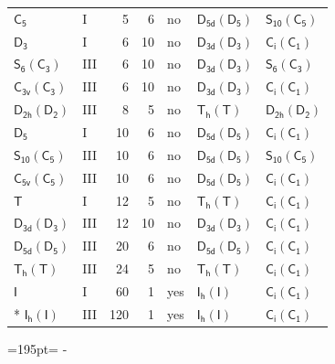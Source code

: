\documentclass[10pt,a4paper]{article}
\newcommand{\needspace}[1]{\par\penalty-100\begingroup\dimen0=#1\relax\dimen2=\pagegoal
  \advance\dimen2-\pagetotal\ifdim\dimen0>\dimen2\relax\ifdim\dimen2>0pt\vfil\break\fi\fi
  \endgroup}
\numberwithin{equation}{section}
\newcommand{\grp}[1]{\mathsf{#1}}
\begin{document}
{\begin{longtable}{@{}llrrlll@{}}
\href{../../../rotation/data/pdf/C5.pdf}{$\grp{C_{5}}$} & I & 5 & 6 & no & \href{D5d-D5.pdf}{$\grp{D_{5d}}(\grp{D_{5}})$} & \href{S10-C5.pdf}{$\grp{S_{10}}(\grp{C_{5}})$}\\
\href{../../../rotation/data/pdf/D3.pdf}{$\grp{D_{3}}$} & I & 6 & 10 & no & \href{D3d-D3.pdf}{$\grp{D_{3d}}(\grp{D_{3}})$} & \href{S2-C1.pdf}{$\grp{C_{i}}(\grp{C_{1}})$}\\
\href{S6-C3.pdf}{$\grp{S_{6}}(\grp{C_{3}})$} & III & 6 & 10 & no & \href{D3d-D3.pdf}{$\grp{D_{3d}}(\grp{D_{3}})$} & \href{S6-C3.pdf}{$\grp{S_{6}}(\grp{C_{3}})$}\\
\href{C3v-C3.pdf}{$\grp{C_{3v}}(\grp{C_{3}})$} & III & 6 & 10 & no & \href{D3d-D3.pdf}{$\grp{D_{3d}}(\grp{D_{3}})$} & \href{S2-C1.pdf}{$\grp{C_{i}}(\grp{C_{1}})$}\\
\href{D2h-D2.pdf}{$\grp{D_{2h}}(\grp{D_{2}})$} & III & 8 & 5 & no & \href{Th-T.pdf}{$\grp{T_{h}}(\grp{T})$} & \href{D2h-D2.pdf}{$\grp{D_{2h}}(\grp{D_{2}})$}\\
\href{../../../rotation/data/pdf/D5.pdf}{$\grp{D_{5}}$} & I & 10 & 6 & no & \href{D5d-D5.pdf}{$\grp{D_{5d}}(\grp{D_{5}})$} & \href{S2-C1.pdf}{$\grp{C_{i}}(\grp{C_{1}})$}\\
\href{S10-C5.pdf}{$\grp{S_{10}}(\grp{C_{5}})$} & III & 10 & 6 & no & \href{D5d-D5.pdf}{$\grp{D_{5d}}(\grp{D_{5}})$} & \href{S10-C5.pdf}{$\grp{S_{10}}(\grp{C_{5}})$}\\
\href{C5v-C5.pdf}{$\grp{C_{5v}}(\grp{C_{5}})$} & III & 10 & 6 & no & \href{D5d-D5.pdf}{$\grp{D_{5d}}(\grp{D_{5}})$} & \href{S2-C1.pdf}{$\grp{C_{i}}(\grp{C_{1}})$}\\
\href{../../../rotation/data/pdf/T.pdf}{$\grp{T}$} & I & 12 & 5 & no & \href{Th-T.pdf}{$\grp{T_{h}}(\grp{T})$} & \href{S2-C1.pdf}{$\grp{C_{i}}(\grp{C_{1}})$}\\
\href{D3d-D3.pdf}{$\grp{D_{3d}}(\grp{D_{3}})$} & III & 12 & 10 & no & \href{D3d-D3.pdf}{$\grp{D_{3d}}(\grp{D_{3}})$} & \href{S2-C1.pdf}{$\grp{C_{i}}(\grp{C_{1}})$}\\
\href{D5d-D5.pdf}{$\grp{D_{5d}}(\grp{D_{5}})$} & III & 20 & 6 & no & \href{D5d-D5.pdf}{$\grp{D_{5d}}(\grp{D_{5}})$} & \href{S2-C1.pdf}{$\grp{C_{i}}(\grp{C_{1}})$}\\
\href{Th-T.pdf}{$\grp{T_{h}}(\grp{T})$} & III & 24 & 5 & no & \href{Th-T.pdf}{$\grp{T_{h}}(\grp{T})$} & \href{S2-C1.pdf}{$\grp{C_{i}}(\grp{C_{1}})$}\\
\href{../../../rotation/data/pdf/I.pdf}{$\grp{I}$} & I & 60 & 1 & yes & \href{Ih-I.pdf}{$\grp{I_{h}}(\grp{I})$} & \href{S2-C1.pdf}{$\grp{C_{i}}(\grp{C_{1}})$}\\*
\href{Ih-I.pdf}{$\grp{I_{h}}(\grp{I})$} & III & 120 & 1 & yes & \href{Ih-I.pdf}{$\grp{I_{h}}(\grp{I})$} & \href{S2-C1.pdf}{$\grp{C_{i}}(\grp{C_{1}})$}\\
\bottomrule\end{longtable}}
\needspace{195pt}
\end{document}
